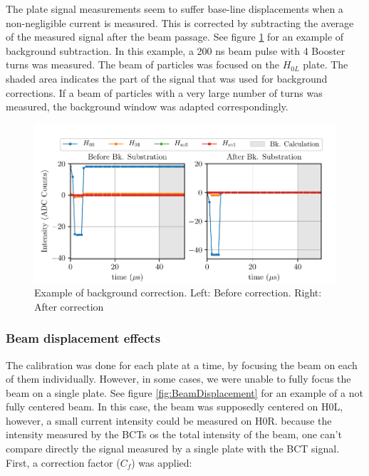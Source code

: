 The plate signal measurements seem to suffer base-line displacements when a non-negligible current is measured. This is corrected by subtracting the average of the measured signal after the beam passage. See figure \ref{fig:BackCorrection} for an example of background subtraction. In this example, a 200 ns beam pulse with 4 Booster turns was measured. The beam of particles was focused on the $H_{0L}$ plate. The shaded area indicates the part of the signal that was used for background corrections. If a beam of particles with a very large number of turns was measured, the background window was adapted correspondingly. 

\begin{figure}[h]
    \centering
    \includegraphics[width=\columnwidth]{Figure_BeforeAfterBackground/BeforeAfterBk.pdf}
    \caption{Example of background correction. Left: Before correction. Right: After correction}
    \label{fig:BackCorrection}
\end{figure}

\subsubsection{Beam displacement effects}

The calibration was done for each plate at a time, by focusing the beam on each of them individually. However, in some cases, we were unable to fully focus the beam on a single plate. See figure \ref{fig:BeamDisplacement} for an example of a not fully centered beam. In this case, the beam was supposedly centered on H0L, however, a small current intensity could be measured on H0R. because the intensity measured by the BCTs os the total intensity of the beam, one can't compare directly the signal measured by a single plate with the BCT signal. First, a correction factor ($C_{f}$) was applied: 

